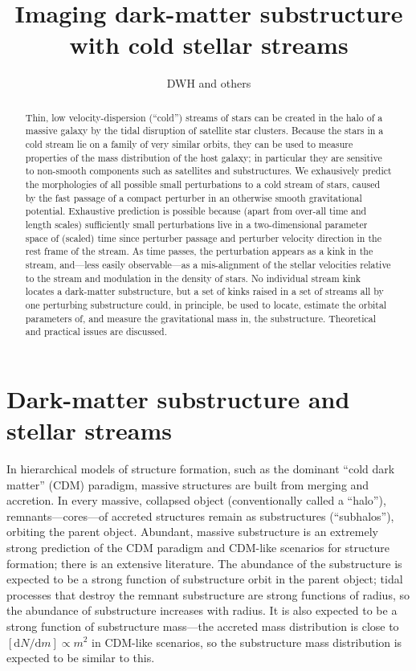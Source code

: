 \documentclass[12pt,preprint]{aastex}
\newcommand{\dd}{\mathrm{d}}
\begin{document}
\title{Imaging dark-matter substructure with cold stellar streams}
\author{DWH and others}

\begin{abstract}
Thin, low velocity-dispersion (``cold'') streams of stars can be
created in the halo of a massive galaxy by the tidal disruption of
satellite star clusters.  Because the stars in a cold stream lie on a
family of very similar orbits, they
can be used to measure properties of the mass distribution of the host
galaxy; in particular they are sensitive to non-smooth components such
as satellites and substructures.  We exhausively predict the
morphologies of all possible small perturbations to a cold stream of
stars, caused by the fast passage of a compact perturber in an
otherwise smooth gravitational potential.  Exhaustive prediction is
possible because (apart from over-all time and length scales)
sufficiently small perturbations live in a two-dimensional parameter
space of (scaled) time since perturber passage and perturber velocity
direction in the rest frame of the stream.  As time passes, the
perturbation appears as a kink in the stream, and---less easily
observable---as a mis-alignment of the stellar velocities relative to
the stream and modulation in the density of stars.  No individual
stream kink locates a dark-matter substructure, but a set of kinks
raised in a set of streams all by one perturbing substructure could,
in principle, be used to locate, estimate the orbital parameters of,
and measure the gravitational mass in, the substructure.  Theoretical
and practical issues are discussed.
\end{abstract}


\section{Dark-matter substructure and stellar streams}

In hierarchical models of structure formation, such as the dominant
``cold dark matter'' (CDM) paradigm, massive structures are built from
merging and accretion.  In every massive,
collapsed object (conventionally called a ``halo''),
remnants---cores---of accreted structures remain as substructures
(``subhalos''), orbiting the parent object.  Abundant, massive
substructure is an extremely strong prediction of the CDM paradigm and
CDM-like scenarios for structure formation; there is an extensive
literature.  The abundance of the substructure is expected to be a
strong function of substructure orbit
in the parent object; tidal processes that
destroy the remnant substructure are strong functions of radius, so
the abundance of substructure increases with radius.  It is also
expected to be a strong function of substructure mass---the accreted
mass distribution is close to $[\dd N / \dd m]\propto m^2$ in CDM-like
scenarios, so the substructure mass distribution is expected to be
similar to this.
\end{document}
